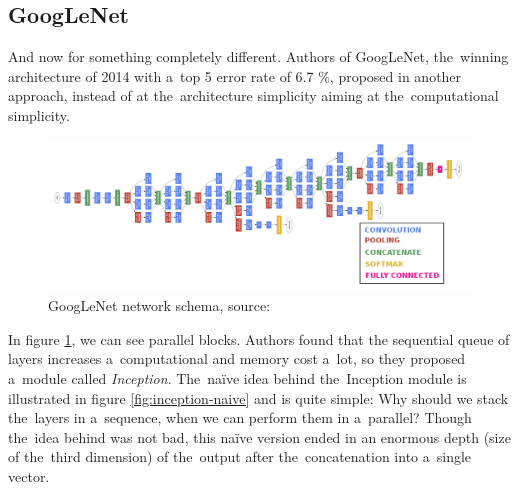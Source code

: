 


\subsection{GoogLeNet}
\label{googlenet}

And now for something completely different. Authors of GoogLeNet, the~winning 
architecture of  2014 with a~top 5 error rate of 6.7 \%, proposed in
\cite{googlenet} another approach, instead of at the~architecture simplicity 
aiming at the~computational simplicity.

\begin{figure}[h]
   \centering
	\includegraphics[width=\linewidth]{./pictures/googlenet.png}
	\caption[GoogLeNet networks]{GoogLeNet network schema, source: 
	\cite{googlenet}}
      \label{fig:googlenet}
\end{figure}

In figure \ref{fig:googlenet}, we can see parallel blocks. Authors found that 
the sequential queue of layers increases a~computational and memory cost a~lot,
so they proposed a~module called \textit{Inception}. The~naïve idea behind
the~Inception module is illustrated in figure \ref{fig:inception-naive} and is
quite simple: Why should we stack the~layers in a~sequence, when we can perform
them in a~parallel? Though the~idea behind was not bad, this naïve version
ended in an enormous depth (size of the~third dimension) of the~output after
the~concatenation into a~single vector.

